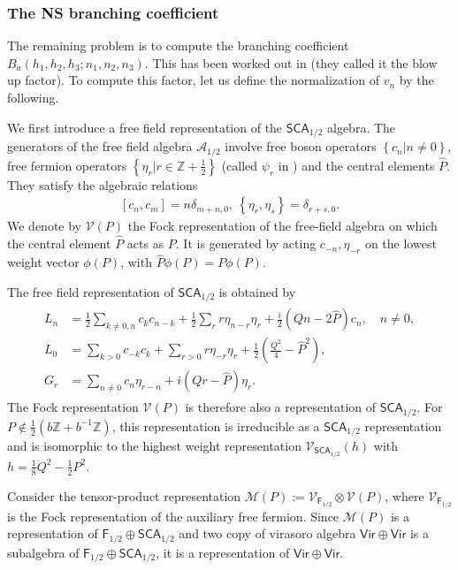 \documentclass[12pt]{article}
\newcommand{\ie}{\begin{equation}\begin{aligned}}
\newcommand{\fe}{\end{aligned}\end{equation}}
\numberwithin{equation}{section}
\begin{document}
\subsubsection*{The NS branching coefficient}

The remaining problem is to compute the branching coefficient $B_a(h_1,h_2,h_3;n_1,n_2,n_3)$. This has been worked out in \cite{1312.4520, 1406.3008} (they called it the blow up factor). To compute this factor, let us define the normalization of $v_n$ by the following. 

We first introduce a free field representation of the $\mathsf{SCA}_{1/2}$ algebra. The generators of the free field algebra $\mathcal{A}_{1/2}$ involve free boson operators $\left\{c_n | n\neq 0\right\}$, free fermion operators $\left\{\eta_r| r\in \mathbb{Z}+\frac{1}{2}\right\}$ (called $\psi_r$ in \cite{1608.02568}) and the central elements $\hat{P}$. They satisfy the algebraic relations
\ie
[c_n,c_m] =n\delta_{m+n,0}, ~\left\{\eta_r,\eta_s\right\}= \delta_{r+s,0}.
\fe
We denote by \(\mathcal{V}(P)\) the Fock representation of the free-field algebra on which the central element \(\hat P\) acts as \(P\). It is generated by acting $c_{-n}, \eta_{-r}$ on the lowest weight vector $\phi(P)$, with $\hat{P} \phi(P)= P \phi(P)$.

The free field representation of $\mathsf{SCA}_{1/2}$ is obtained by
\ie
\begin{aligned}
L_n & =\frac{1}{2} \sum_{k \neq 0, n} c_k c_{n-k}+\frac{1}{2} \sum_r r \eta_{n-r} \eta_r+\frac{i}{2}(Q n - 2 \hat{P}) c_n, \quad n \neq 0, \\
L_0 & =\sum_{k>0} c_{-k} c_k+\sum_{r>0} r \eta_{-r} \eta_r+\frac{1}{2}\left(\frac{Q^2}{4}-\hat{P}^2\right), \\
G_r & =\sum_{n \neq 0} c_n \eta_{r-n}+i(Q r - \hat{P}) \eta_r.
\end{aligned}
\fe
The Fock representation \(\mathcal{V}(P)\) is therefore also a representation of $\mathsf{SCA}_{1/2}$.
For $P\notin \frac{1}{2}(b\mathbb{Z}+b^{-1}\mathbb{Z})$, this representation is irreducible as a $\mathsf{SCA}_{1/2}$ representation and is isomorphic to the highest weight representation $\mathcal{V}_{\mathsf{SCA}_{1/2}}(h)$ with $h = \frac{1}{8}Q^2-\frac{1}{2}P^2$. 

Consider the tensor-product representation $\mathcal{M}(P)
:=
\mathcal{V}_{\mathsf{F}_{1/2}} \otimes \mathcal{V}(P)
$, where \(\mathcal{V}_{\mathsf{F}_{1/2}}\) is the Fock representation of the
auxiliary free fermion. 
Since \(\mathcal{M}(P)\)
is a representation of
\(\mathsf{F}_{1/2}\oplus\mathsf{SCA}_{1/2}\) and two copy of virasoro algebra \(\mathsf{Vir}\oplus\mathsf{Vir}\)  is a subalgebra of \(\mathsf{F}_{1/2}\oplus\mathsf{SCA}_{1/2}\),
it is a representation of \(\mathsf{Vir}\oplus\mathsf{Vir}\). 
\end{document}
